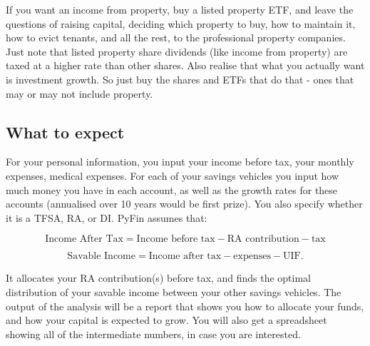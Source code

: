 \documentclass[a4paper, justified]{tufte-handout}
\begin{document}
If you want an income from property, buy a listed property ETF, and leave the questions of raising capital, deciding which property to buy, how to maintain it, how to evict tenants, and all the rest, to the professional property companies. Just note that listed property share dividends (like income from property) are taxed at a higher rate than other shares. Also realise that what you actually want is investment growth. So just buy the shares and ETFs that do that - ones that may or may not include property.

\subsection{What to expect}

For your personal information, you input your income before tax, your monthly expenses, medical expenses. For each of your savings vehicles you input how much money you have in each account, as well as the growth rates for these accounts (annualised over 10 years would be first prize). You also specify whether it is a TFSA, RA, or DI. PyFin assumes that:

\begin{equation}
\textrm{Income After Tax} = \textrm{Income before tax} - \textrm{RA contribution} - \textrm{tax}
\end{equation}

\begin{equation}
\textrm{Savable Income} = \textrm{Income after tax} - \textrm{expenses} - \textrm{UIF}.
\end{equation}

It allocates your RA contribution(s) before tax, and finds the optimal distribution of your savable income between your other savings vehicles. The output of the analysis will be a report that shows you how to allocate your funds, and how your capital is expected to grow. You will also get a spreadsheet showing all of the intermediate numbers, in case you are interested.

\end{document}
